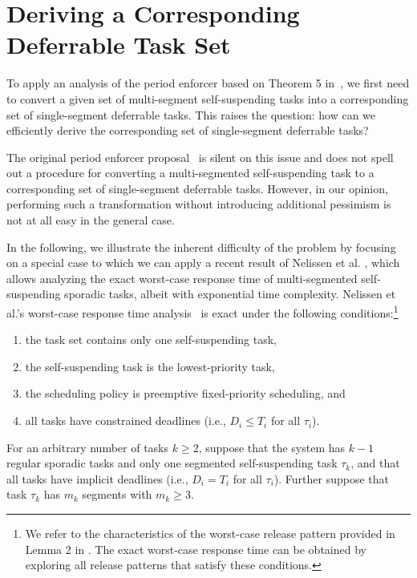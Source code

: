 
\section{Deriving a Corresponding Deferrable Task Set}
\label{sec:convert}

To apply an analysis of the period enforcer based on Theorem 5 in~\cite{Raj:suspension1991}, we first need to convert a given set of multi-segment self-suspending tasks into a corresponding set of single-segment deferrable tasks. This raises the question: how can we efficiently derive the corresponding set of single-segment deferrable tasks? 

The original period enforcer proposal~\cite{Raj:suspension1991} is silent on this issue and does not spell out a procedure for converting a multi-segmented self-suspending task to a corresponding set of single-segment deferrable tasks. However, in our opinion, performing such a transformation without introducing additional pessimism is not at all easy in the general case.

In the following, we illustrate the inherent difficulty of the problem by focusing on a special case to which we can apply a recent result of Nelissen et al. \cite{ecrts15nelissen}, which allows analyzing the exact worst-case response time of multi-segmented self-suspending sporadic tasks, albeit with exponential time complexity. 
Nelissen et al.'s worst-case response time analysis~\cite{ecrts15nelissen} is exact under the following conditions:\footnote{We refer to the characteristics of the worst-case release pattern provided in Lemma 2 in \cite{ecrts15nelissen}. The exact worst-case response time can be obtained by exploring all  release patterns that satisfy these conditions.} 
\begin{enumerate}
	\item the task set contains only one self-suspending task, 
	\item the self-suspending task is the lowest-priority task, 
	\item the scheduling policy is preemptive fixed-priority scheduling, and 
	\item all tasks have constrained deadlines (i.e., $D_i \leq T_i$ for all $\tau_i$).
\end{enumerate}

For an arbitrary number of tasks $k \geq 2$, 
suppose that the system has $k-1$ regular sporadic tasks and only one segmented self-suspending task $\tau_k$, and that all tasks have implicit deadlines (i.e., $D_i = T_i$ for all $\tau_i$). Further suppose that task $\tau_k$ has $m_k$ segments with $m_k \geq 3$.  

